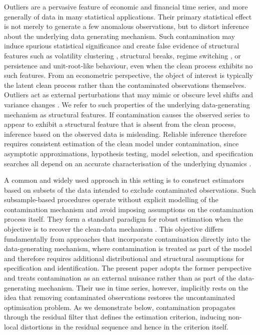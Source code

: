 \documentclass[12pt]{article}
\numberwithin{equation}{section}
\begin{document}
Outliers are a pervasive feature of economic and financial time series, and more generally of data in many statistical applications.
Their primary statistical effect is not merely to generate a few anomalous observations, but to distort inference about the underlying data generating mechanism.
Such contamination may induce spurious statistical significance \citep{Huber1964, Tsay1986, ChenLiu1993, DaviesGather1993} and create false evidence of structural features such as volatility clustering \citep{FransesGhijsels1999, CarneroPenaRuiz2007}, structural breaks, regime switching \citep{Andrews1993, vDFL99}, or persistence and unit-root-like behaviour, even when the clean process exhibits no such features.
From an econometric perspective, the object of interest is typically the latent clean process rather than the contaminated observations themselves.
Outliers act as external perturbations that may mimic or obscure level shifts and variance changes \citep{ChenLiu1993, BoxTiao1975, Tsay1988, FransesHaldrup1994}. 
We refer to such properties of the underlying data-generating mechanism as structural features.
If contamination causes the observed series to appear to exhibit a structural feature that is absent from the clean process, inference based on the observed data is misleading.
Reliable inference therefore requires consistent estimation of the clean model under contamination, since asymptotic approximations, hypothesis testing, model selection, and specification searches all depend on an accurate characterisation of the underlying dynamics \citep{JohansenNielsen2009, DoornikHendry2016}.

A common and widely used approach in this setting is to construct estimators based on subsets of the data intended to exclude contaminated observations. 
Such subsample-based procedures operate without explicit modelling of the contamination mechanism and avoid imposing assumptions on the contamination process itself. 
They form a standard paradigm for robust estimation when the objective is to recover the clean-data mechanism \citep{Huber1964, Ro84, Maronna2006, JohansenNielsen2016}. 
This objective differs fundamentally from approaches that incorporate contamination directly into the data-generating mechanism, where contamination is treated as part of the model and therefore requires additional distributional and structural assumptions for specification and identification.
The present paper adopts the former perspective and treats contamination as an external nuisance rather than as part of the data-generating mechanism. 
Their use in time series, however, implicitly rests on the idea that removing contaminated observations restores the uncontaminated optimisation problem.
As we demonstrate below, contamination propagates through the residual filter that defines the estimation criterion, inducing non-local distortions in the residual sequence and hence in the criterion itself.
\end{document}

